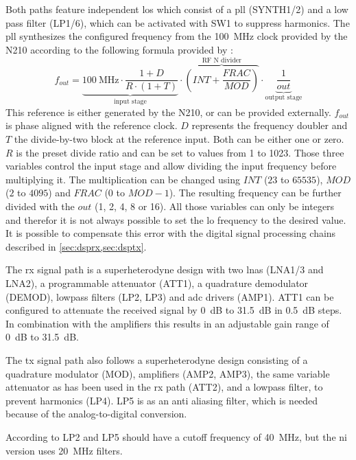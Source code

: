 \documentclass[12pt,a4paper,parskip=full,abstracton]{scrartcl}
\begin{document}
Both paths feature independent \glspl{lo} which consist of a \gls{pll} (SYNTH1/2) and a low
pass filter (LP1/6), which can be activated with SW1 to suppress harmonics\cite{flo}. The
\gls{pll} synthesizes the configured frequency from the \SI{100}{\mega\hertz} clock provided
by the N210 according to the following formula provided by \cite{synth}:
\begin{equation}
\label{eq:frequency}
f_{out} = \underbrace{\SI{100}{\mega\hertz} \cdot \frac{1 + D}{R \cdot (1 + T)}}_\text{input stage} \cdot \overbrace{\left(INT + \frac{FRAC}{MOD}\right)}^\text{RF N divider} \cdot \underbrace{\frac{1}{out}}_\text{output stage}
\end{equation}
This reference is either generated by the N210, or can be provided externally.
$f_{out}$ is phase aligned with the reference clock. $D$ represents the frequency doubler
and $T$ the divide-by-two block at the reference input. Both can
be either one or zero. $R$ is the preset divide ratio and can be set to values from 1 to 1023.
Those three variables control the input stage and allow dividing the input frequency before multiplying
it. The multiplication can be changed using $INT$ ($23$ to $65535$), $MOD$ ($2$ to $4095$)
and $FRAC$ (0 to $MOD - 1$). The resulting frequency can be further divided with the $out$ (1, 2, 4, 8 or 16).
All those variables can only be integers and therefor it is not always possible to set the \gls{lo}
frequency to the desired value. It is possible to compensate this error with the digital signal
processing chains described in \cref{sec:dsprx,sec:dsptx}.

The \gls{rx} signal path is a superheterodyne design with two \glspl{lna} (LNA1/3 and LNA2),
a programmable attenuator (ATT1), a quadrature demodulator (DEMOD), lowpass filters (LP2, LP3)
and \gls{adc} drivers (AMP1). ATT1 can be configured to attenuate the received signal by
\SI{0}{\deci\bel} to \SI{31.5}{\deci\bel} in \SI{0.5}{\deci\bel} steps. In combination with
the amplifiers this results in an adjustable gain range of \SI{0}{\deci\bel} to \SI{31.5}{\deci\bel}.

The \gls{tx} signal path also follows a superheterodyne design consisting of a quadrature
modulator (MOD), amplifiers (AMP2, AMP3), the same variable attenuator as has been used in
the \gls{rx} path (ATT2), and a lowpass filter, to prevent harmonics (LP4). LP5 is as an
anti aliasing filter, which is needed because of the analog-to-digital conversion.

According to \cite{sch_sbx} LP2 and LP5 should have a cutoff frequency of \SI{40}{\mega\hertz},
but the \gls{ni} version uses \SI{20}{\mega\hertz} filters\cite{ni_29xx}.
\end{document}
